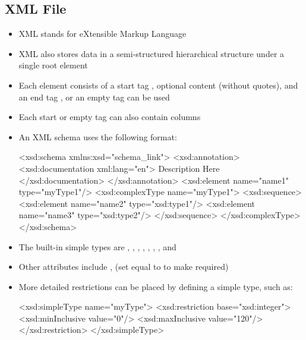 \documentclass[a4paper]{article}
\begin{document}
\subsection{XML File}
\begin{itemize}
    \item XML stands for eXtensible Markup Language
    \item XML also stores data in a semi-structured hierarchical structure under a single root element
    \item Each element consists of a start tag , optional content (without quotes), and an end tag , or an empty tag  can be used
    \item Each start or empty tag can also contain columns 
    \item An XML schema uses the following format:
    \begin{xml}
<xsd:schema xmlns:xsd="schema_link">
<xsd:annotation>
  <xsd:documentation xml:lang="en">
    Description Here
  </xsd:documentation>
</xsd:annotation>
<xsd:element name="name1" type="myType1"/>
<xsd:complexType name="myType1">
  <xsd:sequence>
    <xsd:element name="name2" type="xsd:type1"/>
    <xsd:element name="name3" type="xsd:type2"/>
  </xsd:sequence>
</xsd:complexType>
</xsd:schema>
\end{xml}
    \item The built-in simple types are , , , , ,
    , , and 
    \item Other attributes include ,  (set equal to  to make required)
    \item More detailed restrictions can be placed by defining a simple type, such as:
\begin{xml}
<xsd:simpleType name="myType">
  <xsd:restriction base="xsd:integer">
    <xsd:minInclusive value="0"/>
    <xsd:maxInclusive value="120"/>
  </xsd:restriction>
</xsd:simpleType>
\end{xml}
\end{itemize}
\end{document}

